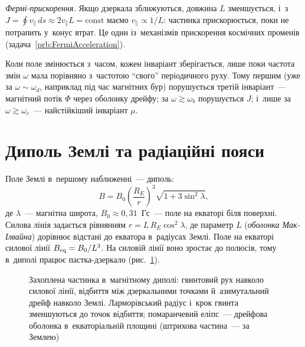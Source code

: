 \emph{Фермі-прискорення.} Якщо дзеркала зближуються, довжина $L$ зменшується, і~з~$J=\oint v_\parallel\,ds\approx2v_\parallel L=\mathrm{const}$
маємо $v_\parallel\propto1/L$: частинка прискорюється, поки не потрапить у~конус втрат. Це один із~механізмів прискорення космічних променів
(задача~\ref{prb:FermiAcceleration}).

Коли поле змінюється з~часом, кожен інваріант зберігається, лише поки частота змін $\omega$ мала порівняно з~частотою \enquote{свого} періодичного руху.
Тому першим (уже за $\omega\sim\omega_d$, наприклад під час магнітних бур) порушується третій інваріант~---
магнітний потік $\Phi$ через оболонку дрейфу; за $\omega\gtrsim\omega_b$ порушується $J$;
і~лише за $\omega\gtrsim\omega_c$~--- найстійкіший інваріант $\mu$.

\section{Диполь Землі та радіаційні пояси}\label{sec:dipole}

Поле Землі в~першому наближенні~--- диполь:
\begin{equation*}
	B=B_0\left(\frac{R_E}{r}\right)^3\sqrt{1+3\sin^2\lambda},
\end{equation*}
де $\lambda$~--- магнітна широта, $B_0\approx0{,}31$~Гс~--- поле на екваторі біля поверхні.
Силова лінія задається рівнянням $r=L\,R_E\cos^2\lambda$, де параметр $L$ (\emph{оболонка
Мак-Ілвайна}) дорівнює відстані до екватора в~радіусах Землі. Поле на екваторі силової лінії
$B_{\rm eq}=B_0/L^3$. На силовій лінії воно зростає до полюсів, тому в~диполі працює
пастка-дзеркало (рис.~\ref{pic:dipole}).

\begin{figure}[h!]\centering
	\caption{Захоплена частинка в~магнітному диполі: гвинтовий рух навколо силової лінії,
	відбиття між дзеркальними точками й~азимутальний дрейф навколо Землі. Ларморівський радіус
	і~крок гвинта зменшуються до точок відбиття; помаранчевий еліпс~--- дрейфова оболонка
	в~екваторіальній площині (штрихова частина~--- за Землею)}
	\label{pic:dipole}
\end{figure}

